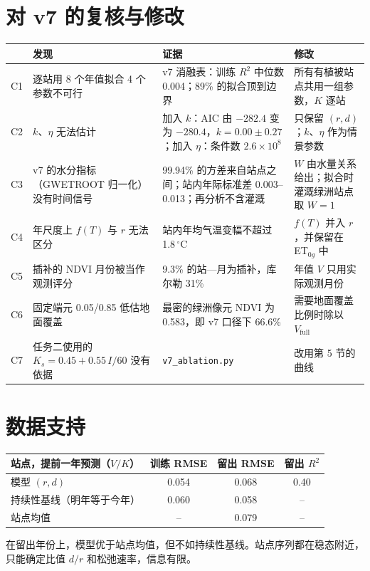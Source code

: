 \documentclass[11pt,a4paper]{ctexart}
\begin{document}
\section{对 v7 的复核与修改}
\begin{table}[H]\small
\begin{tabularx}{\linewidth}{@{}P{0.5cm}P{3.8cm}P{5.6cm}L@{}}
\toprule
 & 发现 & 证据 & 修改\\
\midrule
C1 & 逐站用 8 个年值拟合 4 个参数不可行 & v7 消融表：训练 $R^2$ 中位数 0.004；89\% 的拟合顶到边界 & 所有有植被站点共用一组参数，$K$ 逐站\\
C2 & $k$、$\eta$ 无法估计 & 加入 $k$：AIC 由 $-282.4$ 变为 $-280.4$，$k=0.00\pm0.27$；加入 $\eta$：条件数 $2.6\times10^{8}$ & 只保留 $(r,d)$；$k$、$\eta$ 作为情景参数\\
C3 & v7 的水分指标（GWETROOT 归一化）没有时间信号 & 99.94\% 的方差来自站点之间；站内年际标准差 0.003--0.013；再分析不含灌溉 & $W$ 由水量关系给出；拟合时灌溉绿洲站点取 $W=1$\\
C4 & 年尺度上 $f(T)$ 与 $r$ 无法区分 & 站内年均气温变幅不超过 1.8\,$^\circ$C & $f(T)$ 并入 $r$，并保留在 ET$_{0g}$ 中\\
C5 & 插补的 NDVI 月份被当作观测评分 & 9.3\% 的站—月为插补，库尔勒 31\% & 年值 $V$ 只用实际观测月份\\
C6 & 固定端元 0.05/0.85 低估地面覆盖 & 最密的绿洲像元 NDVI 为 0.583，即 v7 口径下 66.6\% & 需要地面覆盖比例时除以 $V_{\mathrm{full}}$\\
C7 & 任务二使用的 $K_s=0.45+0.55\,I/60$ 没有依据 & \texttt{v7\_ablation.py} & 改用第 5 节的曲线\\
\bottomrule
\end{tabularx}
\end{table}

\section{数据支持}
\begin{table}[H]\small\centering
\begin{tabular}{@{}lccc@{}}
\toprule
站点，提前一年预测（$V/K$） & 训练 RMSE & 留出 RMSE & 留出 $R^2$\\
\midrule
模型 $(r,d)$ & 0.054 & 0.068 & 0.40\\
持续性基线（明年等于今年） & 0.060 & 0.058 & --\\
站点均值 & -- & 0.079 & --\\
\bottomrule
\end{tabular}
\end{table}
在留出年份上，模型优于站点均值，但不如持续性基线。站点序列都在稳态附近，只能确定比值 $d/r$ 和松弛速率，信息有限。
\end{document}
